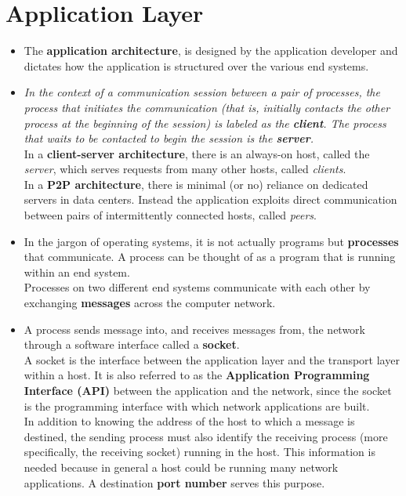 \section{Application Layer}
\begin{itemize}

\item
The \textbf{application architecture}, is designed by the application developer and dictates how the application is structured over the various end systems.

\item
\textit{In the context of a communication session between a pair of processes, the process that initiates the communication (that is, initially contacts the other process at the beginning of the session) is labeled as the \textbf{client}. The process that waits to be contacted to begin the session is the \textbf{server}.}\\
In a \textbf{client-server architecture}, there is an always-on host, called the \textit{server}, which serves requests from many other hosts, called \textit{clients}.\\In a \textbf{P2P architecture}, there is minimal (or no) reliance on dedicated servers in data centers. Instead the application exploits direct communication between pairs of intermittently connected hosts, called \textit{peers}.

\item
In the jargon of operating systems, it is not actually programs but \textbf{processes} that communicate. A process can be thought of as a program that is running within an end system.\\
Processes on two different end systems communicate with each other by exchanging \textbf{messages} across the computer network.

\item
A process sends message into, and receives messages from, the network through a software interface called a \textbf{socket}.\\
A socket is the interface between the application layer and the transport layer within a host. It is also referred to as the \textbf{Application Programming Interface (API)} between the application and the network, since the socket is the programming interface with which network applications are built.\\
In addition to knowing the address of the host to which a message is destined, the sending process must also identify the receiving process (more specifically, the receiving socket) running in the host. This information is needed because in general a host could be running many network applications. A destination \textbf{port number} serves this purpose.


\end{itemize}
